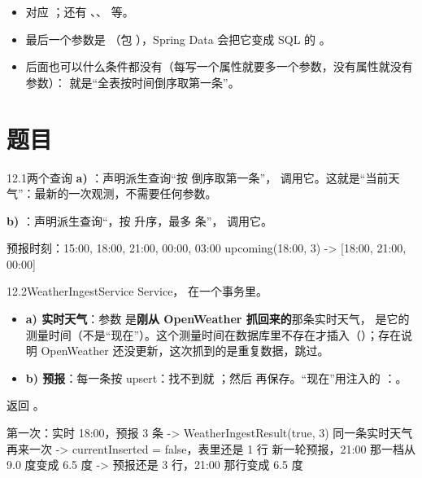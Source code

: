 \begin{itemize}
  \item {} 对应 \code{>=}；还有 、、 等。
  \item 最后一个参数是 （包 ），Spring Data 会把它变成 SQL 的 。
  \item {} 后面也可以什么条件都没有（每写一个属性就要多一个参数，没有属性就没有参数）： 就是“全表按时间倒序取第一条”。
\end{itemize}

\section{题目}

\begin{task}{12.1\quad 两个查询}
\textbf{a)} ：声明派生查询“按  倒序取第一条”， 调用它。这就是“当前天气”：最新的一次观测，不需要任何参数。

\textbf{b)} ：声明派生查询“，按  升序，最多  条”， 调用它。

\begin{example}
\begin{plaincode}
预报时刻：15:00, 18:00, 21:00, 00:00, 03:00
upcoming(18:00, 3)  ->  [18:00, 21:00, 00:00]
\end{plaincode}
\end{example}
\end{task}

\begin{task}{12.2\quad WeatherIngestService}
Service， 在一个事务里。
\begin{itemize}
  \item \textbf{a) 实时天气}：参数  是\textbf{刚从 OpenWeather 抓回来的}那条实时天气， 是它的测量时间（不是“现在”）。这个测量时间在数据库里不存在才插入（）；存在说明 OpenWeather 还没更新，这次抓到的是重复数据，跳过。
  \item \textbf{b) 预报}：每一条按  upsert：找不到就 ；然后  再保存。“现在”用注入的 ：。
\end{itemize}
返回 。

\begin{example}
\begin{plaincode}
第一次：实时 18:00，预报 3 条            ->  WeatherIngestResult(true, 3)
同一条实时天气再来一次                   ->  currentInserted = false，表里还是 1 行
新一轮预报，21:00 那一档从 9.0 度变成 6.5 度 ->  预报还是 3 行，21:00 那行变成 6.5 度
\end{plaincode}
\end{example}
\end{task}

